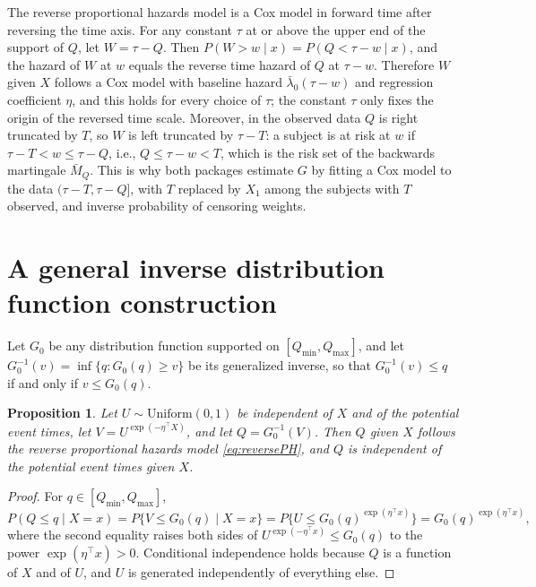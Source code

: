 \documentclass[11pt]{article}
\newtheorem{proposition}{Proposition}
\newcommand{\Qmin}{Q_{\min}}
\newcommand{\Qmax}{Q_{\max}}
\begin{document}
The reverse proportional hazards model is a Cox model in forward time after reversing the
time axis. For any constant $\tau$ at or above the upper end of the support of $Q$, let
$W = \tau - Q$. Then $P(W > w \mid x) = P(Q < \tau - w \mid x)$, and the hazard of $W$ at
$w$ equals the reverse time hazard of $Q$ at $\tau - w$. Therefore $W$ given $X$ follows a
Cox model with baseline hazard $\bar\lambda_0(\tau - w)$ and regression coefficient $\eta$,
and this holds for every choice of $\tau$; the constant $\tau$ only fixes the origin of
the reversed time scale. Moreover, in the observed data $Q$ is right truncated by $T$, so
$W$ is left truncated by $\tau - T$: a subject is at risk at $w$ if
$\tau - T < w \le \tau - Q$, i.e., $Q \le \tau - w < T$, which is the risk set of the
backwards martingale $\bar M_Q$. This is why both packages estimate $G$ by fitting a Cox
model to the data $(\tau - T, \tau - Q]$, with $T$ replaced by $X_1$ among the subjects
with $T$ observed, and inverse probability of censoring weights.

\section{A general inverse distribution function construction}

Let $G_0$ be any distribution function supported on $[\Qmin, \Qmax]$, and let
$G_0^{-1}(v) = \inf\{q : G_0(q) \ge v\}$ be its generalized inverse, so that
$G_0^{-1}(v) \le q$ if and only if $v \le G_0(q)$.

\begin{proposition}\label{prop:construction}
Let $U \sim \mathrm{Uniform}(0, 1)$ be independent of $X$ and of the potential event times,
let $V = U^{\exp(-\eta^\top X)}$, and let $Q = G_0^{-1}(V)$. Then $Q$ given $X$ follows the
reverse proportional hazards model \eqref{eq:reversePH}, and $Q$ is independent of the
potential event times given $X$.
\end{proposition}

\begin{proof}
For $q \in [\Qmin, \Qmax]$,
\begin{equation*}
P(Q \le q \mid X = x) = P\{V \le G_0(q) \mid X = x\}
= P\{U \le G_0(q)^{\exp(\eta^\top x)}\} = G_0(q)^{\exp(\eta^\top x)},
\end{equation*}
where the second equality raises both sides of $U^{\exp(-\eta^\top x)} \le G_0(q)$ to the
power $\exp(\eta^\top x) > 0$. Conditional independence holds because $Q$ is a function of
$X$ and of $U$, and $U$ is generated independently of everything else.
\end{proof}
\end{document}
